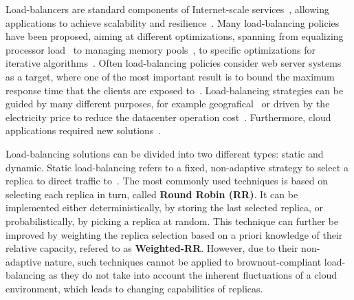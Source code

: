 Load-balancers are standard components of Internet-scale
services~\cite{WangOSDI}, allowing applications to achieve scalability
and resilience~\citep{Barroso09, Hamilton07:LISA,
  clusteredbalancing}. Many load-balancing policies have been
proposed, aiming at different optimizations, spanning from equalizing
processor load~\cite{Stankovic:TC} to managing memory
pools~\cite{PattersonMemoryLB,MemoryLBACC}, to specific optimizations
for iterative algorithms~\cite{BahiIterative}. Often load-balancing
policies consider web server systems~\cite{CLB,Cardellini2003} as a
target, where one of the most important result is to bound the maximum
response time that the clients are exposed
to~\cite{TC-Abdelzaher}. Load-balancing strategies can be guided by
many different purposes, for example
geografical~\cite{GeograficalSASO,geographicalwanbalancing} or driven
by the electricity price to reduce the datacenter operation
cost~\cite{LoadBalancingForElectricity:TCC}. Furthermore, cloud applications
required new solutions~\citep{Barroso09,Lu11:PerfEval,Lin12:IGCC}.


Load-balancing solutions can be divided into two different types:
static and dynamic. Static load-balancing refers to a fixed,
non-adaptive strategy to select a replica to direct traffic
to~\cite{StaticLoadBalancing:TSE,StaticOptimal:ACM}.  The most
commonly used techniques is based on selecting each replica in turn,
called \textbf{Round Robin (RR)}. It can be implemented either
deterministically, by storing the last selected replica, or
probabilistically, by picking a replica at random.  This technique can
further be improved by weighting the replica selection based on a
priori knowledge of their relative capacity, refered to as
\textbf{Weighted-RR}.  However, due to their non-adaptive nature, such
techniques cannot be applied to brownout-compliant load-balancing as
they do not take into account the inherent fluctuations of a cloud
environment, which leads to changing capabilities of replicas.


